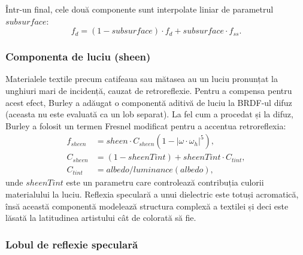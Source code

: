 \documentclass[12pt,a4paper]{report}
\numberwithin{equation}{section} %
\begin{document}
Într-un final, cele două componente sunt interpolate liniar de parametrul $subsurface$:
\begin{equation}\label{eq:disney_diffuse}
	f_{d} = (1 - subsurface)\cdot f_d + subsurface\cdot f_{ss}.
\end{equation}

\subsubsection*{Componenta de luciu (sheen)}

Materialele textile precum catifeaua sau mătasea au un luciu pronunțat la unghiuri
mari de incidență, cauzat de retroreflexie. Pentru a compensa pentru acest efect,
Burley a adăugat o componentă aditivă de luciu la BRDF-ul difuz (aceasta nu este
evaluată ca un lob separat). La fel cum a procedat și la difuz, Burley a folosit
un termen Fresnel modificat pentru a accentua retroreflexia:
\begin{equation}
	\begin{aligned}\label{eq:disney_sheen}
		f_{sheen} & = sheen\cdot C_{sheen}(1 - |\omega\cdot\omega_h|^5), \\
		C_{sheen} & = (1 - sheenTint) + sheenTint\cdot C_{tint},         \\
		C_{tint}  & = albedo/luminance(albedo),
	\end{aligned}
\end{equation}
unde $sheenTint$ este un parametru care controlează contribuția culorii materialului
la luciu. Reflexia speculară a unui dielectric este totuși acromatică, însă această
componentă modelează structura complexă a textilei și deci este lăsată la latitudinea
artistului cât de colorată să fie.

\subsubsection*{Lobul de reflexie speculară}
\end{document}
